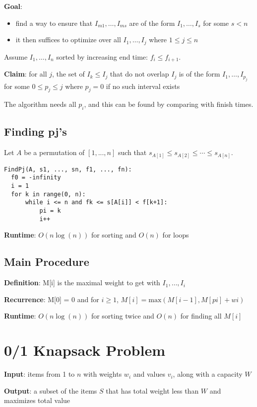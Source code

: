 \documentclass[11pt]{article}
\begin{document}
\textbf{Goal}:
\begin{itemize}
\item find a way to ensure that \(I_{m1}, \dots, I_{ms}\) are of the form \(I_{1}, \dots, I_{s}\) for some
\(s < n\)
\item it then suffices to optimize over all \(I_{1}, \dots, I_{j}\) where \(1 \le j \le n\)
\end{itemize}

Assume \(I_{1}, \dots, I_{n}\) sorted by increasing end time: \(f_{i} \le f_{i + 1}\).

\textbf{Claim}: for all \(j\), the set of \(I_{k} \le I_{j}\) that do not overlap \(I_{j}\) is of the form
\(I_{1}, \dots, I_{p_{j}}\) for some \(0 \le p_{j} \le j\) where \(p_{j} = 0\) if no such interval exists

The algorithm needs all \(p_{i}\), and this can be found by comparing with finish times.
\subsection{Finding pj's}
\label{sec:org4e59da7}
Let \(A\) be a permutation of \([1, ..., n]\) such that
\(s_{A[1]} \le s_{A[2]} \le \cdots \le s_{A[n]}\).
\begin{verbatim}
FindPj(A, s1, ..., sn, f1, ..., fn):
  f0 = -infinity
  i = 1
  for k in range(0, n):
      while i <= n and fk <= s[A[i]] < f[k+1]:
          pi = k
          i++
\end{verbatim}
\textbf{Runtime}: \(O(n\log(n))\) for sorting and \(O(n)\) for loops
\subsection{Main Procedure}
\label{sec:orgfd04204}
\textbf{Definition}: M[i] is the maximal weight to get with \(I_{1}, \dots, I_{i}\)

\textbf{Recurrence}: M[0] = 0 and for \(i \ge 1\), \(M[i] = \text{max}(M[i-1], M[pi] + wi)\)

\textbf{Runtime}: \(O(n\log(n))\) for sorting twice and \(O(n)\) for finding all \(M[i]\)
\section{0/1 Knapsack Problem}
\label{sec:org3c5454d}
\textbf{Input}: items from 1 to \(n\) with weights \(w_{i}\) and values \(v_{i}\), along with a capacity \(W\)

\textbf{Output}: a subset of the items \(S\) that has total weight less than \(W\) and maximizes total value
\end{document}
